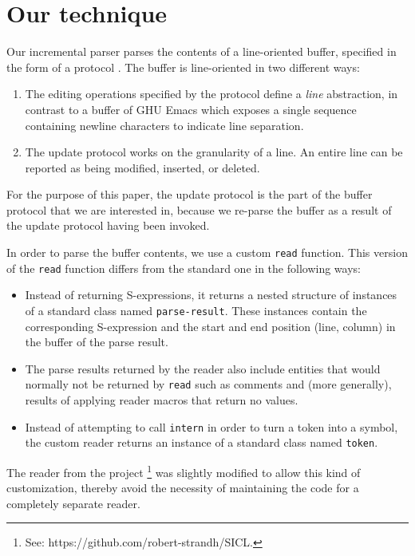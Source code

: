 \section{Our technique}

Our incremental parser parses the contents of a line-oriented buffer,
specified in the form of a \clos{} protocol
\cite{Strandh:2016:CPE:3005729.3005732}.  The buffer is line-oriented
in two different ways:

\begin{enumerate}
\item The editing operations specified by the protocol define a
  \emph{line} abstraction, in contrast to a buffer of GHU Emacs
  \cite{Finseth:1980:TPTa} which exposes a single sequence containing
  newline characters to indicate line separation.
\item The update protocol works on the granularity of a line.  An
  entire line can be reported as being modified, inserted, or
  deleted.
\end{enumerate}

For the purpose of this paper, the update protocol is the part of the
buffer protocol that we are interested in, because we re-parse the
buffer as a result of the update protocol having been invoked.

In order to parse the buffer contents, we use a custom \texttt{read}
function.  This version of the \texttt{read} function differs from the
standard one in the following ways:

\begin{itemize}
\item Instead of returning S-expressions, it returns a nested
  structure of instances of a standard class named
  \texttt{parse-result}.  These instances contain the corresponding
  S-expression and the start and end position (line, column) in the
  buffer of the parse result.
\item The parse results returned by the reader also include entities
  that would normally not be returned by \texttt{read} such as
  comments and (more generally), results of applying reader macros
  that return no values.
\item Instead of attempting to call \texttt{intern} in order to turn a
  token into a symbol, the custom reader returns an instance of a
  standard class named \texttt{token}.
\end{itemize}

The reader from the \sicl{} project%
\footnote{See: https://github.com/robert-strandh/SICL.}
was slightly modified to allow this kind of customization, thereby
avoid the necessity of maintaining the code for a completely separate
reader.

